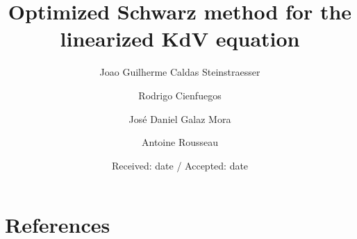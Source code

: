 \documentclass[preprint]{elsarticle}
\begin{document}
\begin{frontmatter}

\title{Optimized Schwarz method for the linearized KdV equation}
\date{Received: date / Accepted: date}




\author[meric]{Joao Guilherme Caldas Steinstraesser}

\author[puc]{Rodrigo Cienfuegos}

\author[puc]{José Daniel Galaz Mora}

\author[inria]{Antoine Rousseau}



\address[meric]{ MERIC, Marine Energy Research \& Innovation Center, Avda. Apoquindo 2827, Santiago, Chile}
\address[puc]{Departamento de Ingeniería Hidráulica y Ambiental, Pontificia Universidad Católica de Chile, Av. Vicuña Mackenna 4680 - Macul, Santiago, Chile}
\address[inria]{Inria and Inria Chile, Avda. Apoquindo 2827, Santiago, Chile}





%





\end{frontmatter}









\section*{References}

\newpage
\end{document}
